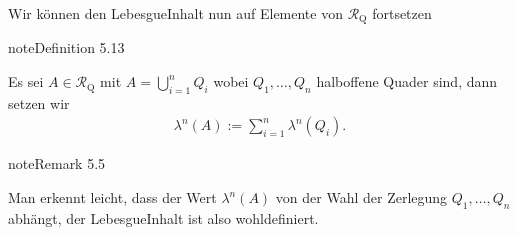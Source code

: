 \documentclass[letterpaper,10pt,german]{jupyterBook}
\begin{document}
\sphinxAtStartPar
Wir können den Lebesgue\sphinxhyphen{}Inhalt nun auf Elemente von \(\mathcal{R}_{\text{Q}}\) fortsetzen
\label{masstheorie/masstheorie:definition-24}
\begin{sphinxadmonition}{note}{Definition 5.13}



\sphinxAtStartPar
Es sei \(A\in\mathcal{R}_{\text{Q}}\) mit \(A=\bigcup_{i=1}^n Q_i\) wobei \(Q_1,\ldots,Q_n\)  halboffene Quader sind, dann setzen wir
\begin{equation*}
\begin{split}\lambda^n(A):=\sum_{i=1}^{n} \lambda^n(Q_i).\end{split}
\end{equation*}\end{sphinxadmonition}
\label{masstheorie/masstheorie:remark-25}
\begin{sphinxadmonition}{note}{Remark 5.5}



\sphinxAtStartPar
Man erkennt leicht, dass der Wert \(\lambda^n(A)\)  von der Wahl der Zerlegung \(Q_1,\ldots,Q_n\) abhängt, der Lebesgue\sphinxhyphen{}Inhalt ist also wohldefiniert.
\end{sphinxadmonition}
\end{document}
